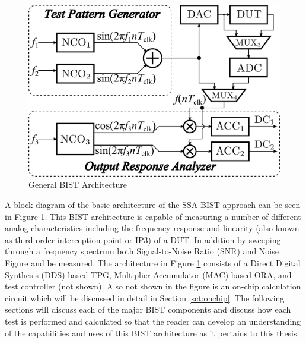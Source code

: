 \documentclass[12pt]{report}
\begin{document}
\begin{figure}
	\begin{center}
		\includegraphics[scale=.5]{images/bist-ssa-architecture}
	\end{center}
	\caption{General BIST Architecture\cite{testtime}}
	\label{fig:bist-ssa}
\end{figure}
A block diagram of the basic architecture of the SSA BIST approach can be seen in Figure \ref{fig:bist-ssa}.  This BIST architecture is capable of measuring a number of different analog characteristics including the frequency response and linearity (also known as third-order interception point or IP3) of a DUT\cite{basessa}.  In addition by sweeping through a frequency spectrum both Signal-to-Noise Ratio (SNR) and Noise Figure\cite{noisefigure} and be measured.  The architecture in Figure \ref{fig:bist-ssa} consists of a Direct Digital Synthesis (DDS) based TPG, Multiplier-Accumulator (MAC) based ORA, and test controller (not shown).  Also not shown in the figure is an on-chip calculation circuit which will be discussed in detail in Section \ref{sct:onchip}.  The following sections will discuss each of the major BIST components and discuss how each test is performed and calculated so that the reader can develop an understanding of the capabilities and uses of this BIST architecture as it pertains to this thesis.
\end{document}
